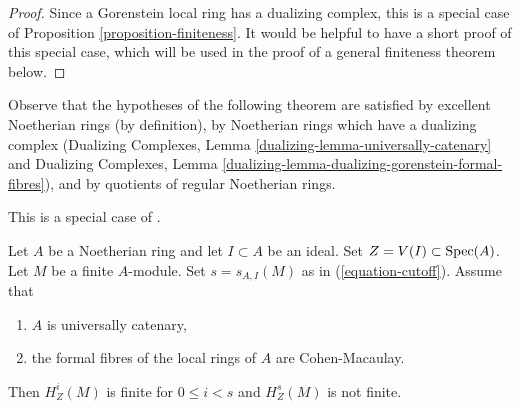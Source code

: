 \begin{proof}
Since a Gorenstein local ring has a dualizing complex,
this is a special case of Proposition \ref{proposition-finiteness}.
It would be helpful to have a short proof of this special case,
which will be used in the proof of a general finiteness theorem below.
\end{proof}

\noindent
Observe that the hypotheses of the following theorem are satisfied
by excellent Noetherian rings (by definition),
by Noetherian rings which have a dualizing complex
(Dualizing Complexes, Lemma \ref{dualizing-lemma-universally-catenary} and
Dualizing Complexes, Lemma
\ref{dualizing-lemma-dualizing-gorenstein-formal-fibres}), and
by quotients of regular Noetherian rings.

\begin{theorem}
\label{theorem-finiteness}
\begin{reference}
This is a special case of \cite[Satz 2]{Faltings-finiteness}.
\end{reference}
Let $A$ be a Noetherian ring and let $I \subset A$ be an ideal.
Set $Z = V(I) \subset \mathop{\mathrm{Spec}}(A)$. Let $M$ be a finite $A$-module.
Set $s = s_{A, I}(M)$ as in (\ref{equation-cutoff}).
Assume that
\begin{enumerate}
\item $A$ is universally catenary,
\item the formal fibres of the local rings of $A$ are Cohen-Macaulay.
\end{enumerate}
Then $H^i_Z(M)$ is finite for $0 \leq i < s$ and
$H^s_Z(M)$ is not finite.
\end{theorem}

